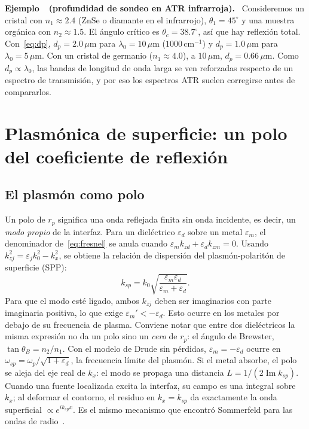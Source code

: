 \documentclass[11pt,letterpaper]{article}
\newcounter{ejemplo}
\newenvironment{ejemplo}[1]{%
  \refstepcounter{ejemplo}%
  \begin{ejemplobox}\textbf{Ejemplo~\theejemplo\ (#1).}\ }%
  {\end{ejemplobox}}
\newcommand{\eps}{\varepsilon}
\renewcommand{\Im}{\operatorname{Im}}
\begin{document}
\begin{ejemplo}{profundidad de sondeo en ATR infrarroja}
Consideremos un cristal con $n_1\approx2.4$ (ZnSe o diamante en el
infrarrojo), $\theta_1=45^\circ$ y una muestra orgánica con $n_2\approx1.5$.
El ángulo crítico es $\theta_c=38.7^\circ$, así que hay reflexión total.
Con~\eqref{eq:dp}, $d_p=2.0\,\mu$m para $\lambda_0=10\,\mu$m
($1000\,\mathrm{cm^{-1}}$) y $d_p=1.0\,\mu$m para $\lambda_0=5\,\mu$m. Con un
cristal de germanio ($n_1\approx4.0$), a $10\,\mu$m, $d_p=0.66\,\mu$m. Como
$d_p\propto\lambda_0$, las bandas de longitud de onda larga se ven reforzadas
respecto de un espectro de transmisión, y por eso los espectros ATR suelen
corregirse antes de compararlos.
\end{ejemplo}

\section{Plasmónica de superficie: un polo del coeficiente de reflexión}\label{sec:spp}

\subsection{El plasmón como polo}

Un polo de $r_p$ significa una onda reflejada finita sin onda incidente, es
decir, un \emph{modo propio} de la interfaz. Para un dieléctrico $\eps_d$ sobre
un metal $\eps_m$, el denominador de~\eqref{eq:fresnel} se anula cuando
$\eps_mk_{zd}+\eps_dk_{zm}=0$. Usando $k_{zj}^2=\eps_jk_0^2-k_x^2$, se obtiene
la relación de dispersión del plasmón-polaritón de superficie (SPP):
\begin{equation}\label{eq:spp}
  k_{sp}=k_0\sqrt{\frac{\eps_m\eps_d}{\eps_m+\eps_d}}.
\end{equation}
Para que el modo esté ligado, ambos $k_{zj}$ deben ser imaginarios con parte
imaginaria positiva, lo que exige $\eps_m'<-\eps_d$. Esto ocurre en los metales
por debajo de su frecuencia de plasma. Conviene notar que entre dos
dieléctricos la misma expresión no da un polo sino un \emph{cero} de $r_p$: el
ángulo de Brewster, $\tan\theta_B=n_2/n_1$. Con el modelo de Drude sin
pérdidas, $\eps_m=-\eps_d$ ocurre en $\omega_{sp}=\omega_p/\sqrt{1+\eps_d}$, la
frecuencia límite del plasmón. Si el metal absorbe, el polo se aleja del eje
real de $k_x$: el modo se propaga una distancia $L=1/(2\Im k_{sp})$. Cuando una
fuente localizada excita la interfaz, su campo es una integral sobre $k_x$; al
deformar el contorno, el residuo en $k_x=k_{sp}$ da exactamente la onda
superficial $\propto e^{ik_{sp}x}$. Es el mismo mecanismo que encontró
Sommerfeld para las ondas de radio~\cite{Sommerfeld}.
\end{document}
